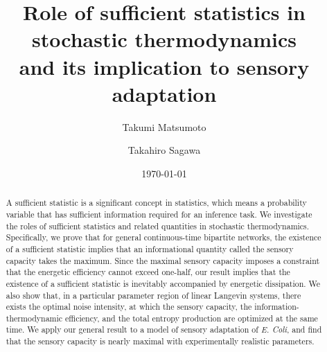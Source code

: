 \documentclass[%
 reprint,
 amsmath,amssymb,
 aps,
]{revtex4-1}
\theoremstyle{plain}
\begin{document}

\title{Role of sufficient statistics in stochastic thermodynamics \\and its implication to sensory adaptation}%

\author{Takumi Matsumoto}
\author{Takahiro Sagawa}%
%


\date{\today}%

\begin{abstract}
A sufficient statistic is a significant concept in statistics, which means a probability variable that has sufficient information required for an inference task. We investigate the roles of sufficient statistics and related quantities in stochastic thermodynamics. Specifically, we prove that for general continuous-time bipartite networks, the existence of a sufficient statistic implies that an informational quantity called the sensory capacity takes the maximum. Since the maximal sensory capacity imposes a constraint that the energetic efficiency cannot exceed one-half, our result implies that the existence of a sufficient statistic is inevitably accompanied by energetic dissipation. We also show that, in a particular parameter region of linear Langevin systems, there exists the optimal noise intensity, at which the sensory capacity, the information-thermodynamic efficiency, and the total entropy production are optimized at the same time. We apply our general result to a model of sensory adaptation of {\it E. Coli}, and  find that the sensory capacity is nearly maximal with experimentally realistic parameters.
\end{abstract}

\maketitle
\end{document}
